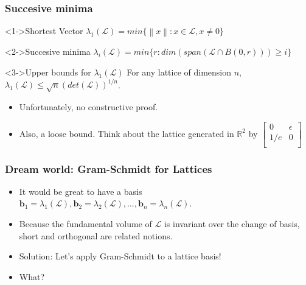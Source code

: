 \documentclass{beamer}
\newcommand{\norm}[1]{\left\lVert#1\right\rVert}
\begin{document}
\begin{frame}
    \frametitle{Succesive minima}
    \begin{block}<1->{Shortest Vector}
        $\lambda_1(\mathcal{L}) = min \{ \norm{x} : x \in \mathcal{L}, x \neq 0 \} $
    \end{block}
    \begin{block}<2->{Succesive minima}
        $\lambda_i(\mathcal{L}) = min \{ r : dim( span( \mathcal{L} \cap B(0, r) )) \geq i \} $
    \end{block}
    \begin{block}<3->{Upper bounds for $\lambda_1(\mathcal{L})$}
        For any lattice of dimension $n$, $\lambda_1(\mathcal{L}) \le \sqrt{n}(det(\mathcal{L}))^{ 1/n }$.
    \end{block}
    \begin{itemize}
        \pause \pause \pause \item Unfortunately, no constructive proof.
        \pause \item Also, a loose bound. Think about the lattice generated in $\mathbb{R}^2$ by 
        $\begin{bmatrix}
        0 & \epsilon \\
        1/e & 0 \\
        \end{bmatrix}$
    \end{itemize}
\end{frame}

\begin{frame}
    \frametitle{Dream world: Gram-Schmidt for Lattices}
    \begin{itemize}
        \item It would be great to have a basis $\mathbf{b}_1 = \lambda_1(\mathcal{L}), \mathbf{b}_2 = \lambda_2(\mathcal{L}), \dots, \mathbf{b}_n = \lambda_n(\mathcal{L})$.
        \pause \item Because the fundamental volume of $\mathcal{L}$ is invariant over the change of basis, short and orthogonal are related notions.
        \pause \item Solution: Let's apply Gram-Schmidt to a lattice basis!
        \pause \item What?
    \end{itemize}
\end{frame}
\end{document}

